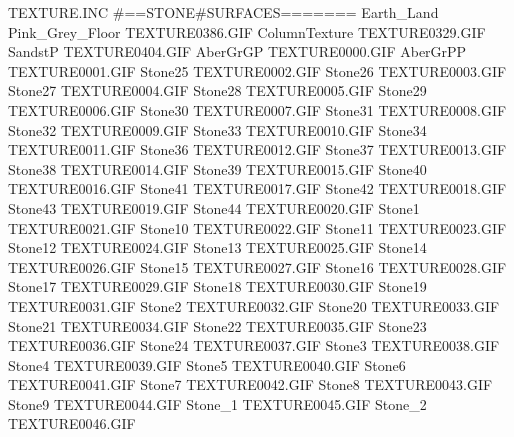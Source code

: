 TEXTURE\POVLAB.INC
#==STONE#SURFACES=======
Earth_Land
Pink_Grey_Floor                TEXTURE\TEX0386.GIF
ColumnTexture                  TEXTURE\TEX0329.GIF
SandstP                        TEXTURE\TEX0404.GIF
AberGrGP                       TEXTURE\TEX0000.GIF
AberGrPP                       TEXTURE\TEX0001.GIF
Stone25                        TEXTURE\TEX0002.GIF
Stone26                        TEXTURE\TEX0003.GIF
Stone27                        TEXTURE\TEX0004.GIF
Stone28                        TEXTURE\TEX0005.GIF
Stone29                        TEXTURE\TEX0006.GIF
Stone30                        TEXTURE\TEX0007.GIF
Stone31                        TEXTURE\TEX0008.GIF
Stone32                        TEXTURE\TEX0009.GIF
Stone33                        TEXTURE\TEX0010.GIF
Stone34                        TEXTURE\TEX0011.GIF
Stone36                        TEXTURE\TEX0012.GIF
Stone37                        TEXTURE\TEX0013.GIF
Stone38                        TEXTURE\TEX0014.GIF
Stone39                        TEXTURE\TEX0015.GIF
Stone40                        TEXTURE\TEX0016.GIF
Stone41                        TEXTURE\TEX0017.GIF
Stone42                        TEXTURE\TEX0018.GIF
Stone43                        TEXTURE\TEX0019.GIF
Stone44                        TEXTURE\TEX0020.GIF
Stone1                         TEXTURE\TEX0021.GIF
Stone10                        TEXTURE\TEX0022.GIF
Stone11                        TEXTURE\TEX0023.GIF
Stone12                        TEXTURE\TEX0024.GIF
Stone13                        TEXTURE\TEX0025.GIF
Stone14                        TEXTURE\TEX0026.GIF
Stone15                        TEXTURE\TEX0027.GIF
Stone16                        TEXTURE\TEX0028.GIF
Stone17                        TEXTURE\TEX0029.GIF
Stone18                        TEXTURE\TEX0030.GIF
Stone19                        TEXTURE\TEX0031.GIF
Stone2                         TEXTURE\TEX0032.GIF
Stone20                        TEXTURE\TEX0033.GIF
Stone21                        TEXTURE\TEX0034.GIF
Stone22                        TEXTURE\TEX0035.GIF
Stone23                        TEXTURE\TEX0036.GIF
Stone24                        TEXTURE\TEX0037.GIF
Stone3                         TEXTURE\TEX0038.GIF
Stone4                         TEXTURE\TEX0039.GIF
Stone5                         TEXTURE\TEX0040.GIF
Stone6                         TEXTURE\TEX0041.GIF
Stone7                         TEXTURE\TEX0042.GIF
Stone8                         TEXTURE\TEX0043.GIF
Stone9                         TEXTURE\TEX0044.GIF
Stone_1                        TEXTURE\TEX0045.GIF
Stone_2                        TEXTURE\TEX0046.GIF
